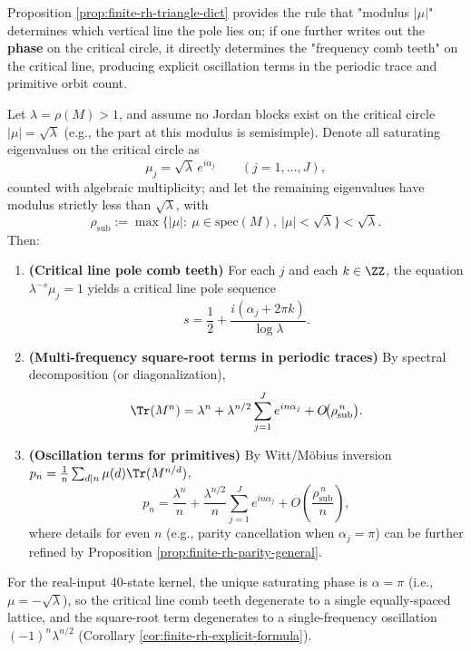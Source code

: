 \begin{remark}[Zero--oscillation dictionary: critical circle spectrum \texorpdfstring{$\Rightarrow$}{=>} critical line comb teeth and multi-frequency square-root terms]\label{rem:finite-rh-zero-oscillation-dict}
Proposition \ref{prop:finite-rh-triangle-dict} provides the rule that "modulus \(|\mu|\)" determines which vertical line the pole lies on; if one further writes out the \textbf{phase} on the critical circle, it directly determines the "frequency comb teeth" on the critical line, producing explicit oscillation terms in the periodic trace and primitive orbit count.
\par
Let \(\lambda=\rho(M)>1\), and assume no Jordan blocks exist on the critical circle \(|\mu|=\sqrt{\lambda}\) (e.g., the part at this modulus is semisimple). Denote all saturating eigenvalues on the critical circle as
\[
\mu_j=\sqrt{\lambda}\,e^{i\alpha_j}\qquad(j=1,\dots,J),
\]
counted with algebraic multiplicity; and let the remaining eigenvalues have modulus strictly less than \(\sqrt{\lambda}\), with
\[
\rho_{\mathrm{sub}}:=\max\{|\mu|:\ \mu\in\mathrm{spec}(M),\ |\mu|<\sqrt{\lambda}\}<\sqrt{\lambda}.
\]
Then:
\begin{enumerate}
  \item \textbf{(Critical line pole comb teeth)} For each \(j\) and each \(k\in\ZZ\), the equation \(\lambda^{-s}\mu_j=1\) yields a critical line pole sequence
  \[
  s=\frac12+\frac{i(\alpha_j+2\pi k)}{\log\lambda}.
  \]
  \item \textbf{(Multi-frequency square-root terms in periodic traces)} By spectral decomposition (or diagonalization),
  \[
  \Tr(M^n)=\lambda^n+\lambda^{n/2}\sum_{j=1}^{J}e^{in\alpha_j}+O\!\bigl(\rho_{\mathrm{sub}}^{\,n}\bigr).
  \]
  \item \textbf{(Oscillation terms for primitives)} By Witt/M\"obius inversion
  \(p_n=\frac{1}{n}\sum_{d\mid n}\mu(d)\Tr(M^{n/d})\),
  \[
  p_n=\frac{\lambda^n}{n}+\frac{\lambda^{n/2}}{n}\sum_{j=1}^{J}e^{in\alpha_j}
  +O\!\left(\frac{\rho_{\mathrm{sub}}^{\,n}}{n}\right),
  \]
  where details for even \(n\) (e.g., parity cancellation when \(\alpha_j=\pi\)) can be further refined by Proposition \ref{prop:finite-rh-parity-general}.
\end{enumerate}
For the real-input 40-state kernel, the unique saturating phase is \(\alpha=\pi\) (i.e., \(\mu=-\sqrt{\lambda}\)), so the critical line comb teeth degenerate to a single equally-spaced lattice, and the square-root term degenerates to a single-frequency oscillation \(({-}1)^n\lambda^{n/2}\) (Corollary \ref{cor:finite-rh-explicit-formula}).
\end{remark}

